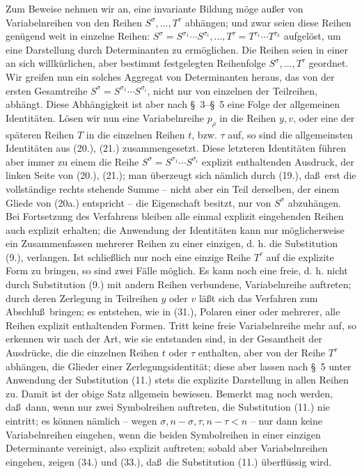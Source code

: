 \documentclass[11pt]{article}
\begin{document}
Zum Beweise nehmen wir an, eine invariante Bildung m\"oge au\ss er von Variabelnreihen von den Reihen $S^\sigma,\ldots,T^\tau$ abh\"angen; und zwar seien diese Reihen gen\"ugend weit in einzelne Reihen: $S^\sigma=S^{\sigma_1}\cdots S^{\sigma_i},\ldots,T^\tau=T^{\tau_1}\cdots T^{\tau_k}$ aufgel\"ost, um eine Darstellung durch Determinanten zu erm\"oglichen. Die Reihen seien in einer an sich willk\"urlichen, aber bestimmt festgelegten Reihenfolge $S^\sigma,\ldots,T^\tau$ geordnet. Wir greifen nun ein solches Aggregat von Determinanten heraus, das von der ersten Gesamtreihe $S^\sigma=S^{\sigma_1}\cdots S^{\sigma_i}$, nicht nur von einzelnen der Teilreihen, abh\"angt. Diese Abh\"angigkeit ist aber nach \S\ 3--\S\ 5 eine Folge der allgemeinen Identit\"aten. L\"osen wir nun eine Variabelnreihe $p_\rho$ in die Reihen $y,v$, oder eine der sp\"ateren Reihen $T$ in die einzelnen Reihen $t$, bzw. $\tau$ auf, so sind die allgemeinsten Identit\"aten aus (20.), (21.) zusammengesetzt. Diese letzteren Identit\"aten f\"uhren aber immer zu einem die Reihe $S^\sigma=S^{\sigma_1}\cdots S^{\sigma_i}$ explizit enthaltenden Ausdruck, der linken Seite von (20.), (21.); man \"uberzeugt sich n\"amlich durch (19.), da\ss\ erst die vollst\"andige rechts stehende Summe -- nicht aber ein Teil derselben, der einem Gliede von (20a.) entspricht -- die Eigenschaft besitzt, nur von $S^\sigma$ abzuh\"angen. Bei Fortsetzung des Verfahrens bleiben alle einmal explizit eingehenden Reihen auch explizit erhalten; die Anwendung der Identit\"aten kann nur m\"oglicherweise ein Zusammenfassen mehrerer Reihen zu einer einzigen, d. h. die Substitution (9.), verlangen. Ist schlie\ss lich nur noch eine einzige Reihe $T^\tau$ auf die explizite Form zu bringen, so sind zwei F\"alle m\"oglich. Es kann noch eine freie, d. h. nicht durch Substitution (9.) mit andern Reihen verbundene, Variabelnreihe auftreten; durch deren Zerlegung in Teilreihen $y$ oder $v$ l\"a\ss t sich das Verfahren zum Abschlu\ss\ bringen; es entstehen, wie in (31.), Polaren einer oder mehrerer, alle Reihen explizit enthaltenden Formen. Tritt keine freie Variabelnreihe mehr auf, so erkennen wir nach der Art, wie sie entstanden sind, in der Gesamtheit der Ausdr\"ucke, die die einzelnen Reihen $t$ oder $\tau$ enthalten, aber von der Reihe $T^\tau$ abh\"angen, die Glieder einer Zerlegungsidentit\"at; diese aber lassen nach \S\ 5 unter Anwendung der Substitution (11.) stets die explizite Darstellung in allen Reihen zu. Damit ist der obige Satz allgemein bewiesen. Bemerkt mag noch werden, da\ss\ dann, wenn nur zwei Symbolreihen auftreten, die Substitution (11.) nie eintritt; es k\"onnen n\"amlich -- wegen $\sigma,n-\sigma,\tau,n-\tau<n$ -- nur dann keine Variabelnreihen eingehen, wenn die beiden Symbolreihen in einer einzigen Determinante vereinigt, also explizit auftreten; sobald aber Variabelnreihen eingehen, zeigen (34.) und (33.), da\ss\ die Substitution (11.) \"uberfl\"ussig wird.
\end{document}
